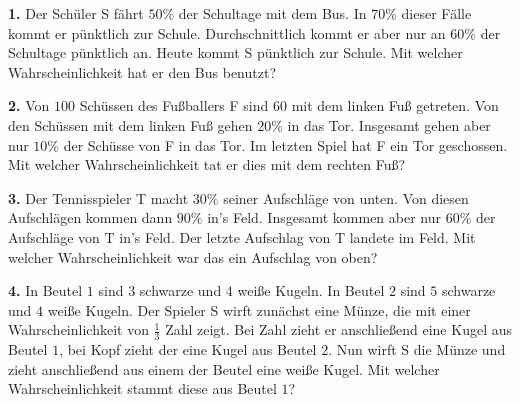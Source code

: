\documentclass{article}
\begin{document}
\setcounter{section}{1}\setcounter{subsection}{0}

\textbf{1.} Der Sch\"uler S f\"ahrt $50\%$ der Schultage mit dem Bus. In $70\%$ dieser F\"alle kommt er p\"unktlich zur Schule. Durchschnittlich kommt er aber nur an $60\%$ der Schultage p\"unktlich an. Heute kommt S p\"unktlich zur Schule. Mit welcher Wahrscheinlichkeit hat er den Bus benutzt?

\textbf{2.} Von $100$ Sch\"ussen des Fußballers F sind $60$ mit dem linken Fuß getreten. Von den Sch\"ussen mit dem linken Fuß gehen $20\%$ in das Tor. Insgesamt gehen aber nur $10\%$ der Sch\"usse von F in das Tor. Im letzten Spiel hat F ein Tor geschossen. Mit welcher Wahrscheinlichkeit tat er dies mit dem rechten Fuß?

\textbf{3.} Der Tennisspieler T macht $30\%$ seiner Aufschl\"age von unten. Von diesen Aufschl\"agen kommen dann $90\%$ in's Feld. Insgesamt kommen aber nur $60\%$ der Aufschl\"age von T in's Feld. Der letzte Aufschlag von T landete im Feld. Mit welcher Wahrscheinlichkeit war das ein Aufschlag von oben?

\textbf{4.} In Beutel $1$ sind $3$ schwarze und $4$ weiße Kugeln. In Beutel $2$ sind $5$ schwarze und $4$ weiße Kugeln. Der Spieler S wirft zun\"achst eine M\"unze, die mit einer Wahrscheinlichkeit von $\frac{1}{3}$ Zahl zeigt. Bei Zahl zieht er anschließend eine Kugel aus Beutel $1$, bei Kopf zieht der eine Kugel aus Beutel $2$. Nun wirft S die M\"unze und zieht anschließend aus einem der Beutel eine weiße Kugel. Mit welcher Wahrscheinlichkeit stammt diese aus Beutel $1$?
\end{document}
